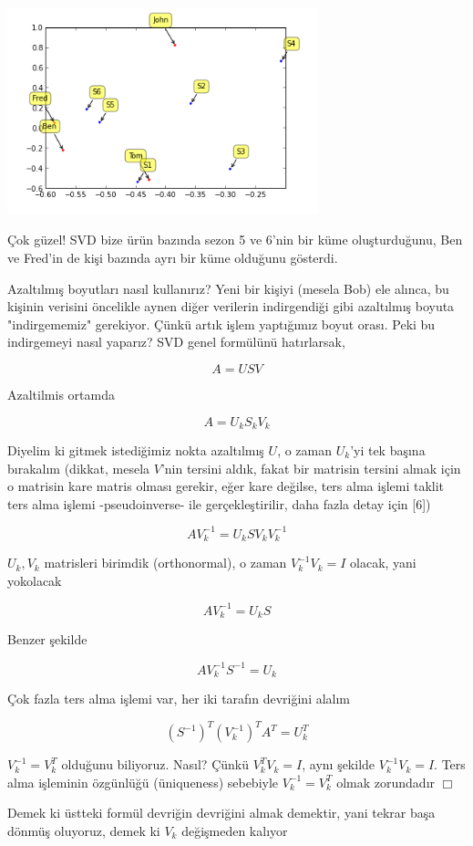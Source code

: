 \documentclass[12pt,fleqn]{article}\usepackage{../../common}
\begin{document}
\includegraphics[height=6cm]{svdrecom_1.png}

Çok güzel! SVD bize ürün bazında sezon 5 ve 6'nin bir küme
oluşturduğunu, Ben ve Fred'in de kişi bazında ayrı bir küme olduğunu
gösterdi.

Azaltılmış boyutları nasıl kullanırız? Yeni bir kişiyi (mesela Bob)
ele alınca, bu kişinin verisini öncelikle aynen diğer verilerin
indirgendiği gibi azaltılmış boyuta "indirgememiz" gerekiyor. Çünkü
artık işlem yaptığımız boyut orası. Peki bu indirgemeyi nasıl yaparız?
SVD genel formülünü hatırlarsak,

$$ A = USV $$

Azaltilmis ortamda

$$ A = U_k S_k V_k $$

Diyelim ki gitmek istediğimiz nokta azaltılmış $U$, o zaman $U_k$'yi tek
başına bırakalım (dikkat, mesela $V$'nin tersini aldık, fakat bir matrisin
tersini almak için o matrisin kare matris olması gerekir, eğer kare
değilse, ters alma işlemi taklit ters alma işlemi -pseudoinverse- ile
gerçekleştirilir, daha fazla detay için [6])

$$ A V_k^{-1} = U_k S V_k V_k^{-1} $$

$U_k,V_k$ matrisleri birimdik (orthonormal), o zaman $V_k^{-1}V_k = I$
olacak, yani yokolacak

$$ A V_k^{-1} = U_k S  $$

Benzer şekilde

$$  A V_k^{-1} S^{-1} = U_k $$

Çok fazla ters alma işlemi var, her iki tarafın devriğini alalım

$$ (S^{-1})^T (V_k^{-1})^T A^T = U_k^T $$

$V_k^{-1} = V_k^T$ olduğunu biliyoruz. Nasıl? Çünkü $ V_k^TV_k = I $, aynı
şekilde $ V_k^{-1}V_k = I $. Ters alma işleminin özgünlüğü (üniqueness)
sebebiyle $V_k^{-1} = V_k^T$ olmak zorundadır $\Box$

Demek ki üstteki formül devriğin devriğini almak demektir, yani tekrar başa
dönmüş oluyoruz, demek ki $V_k$ değişmeden kalıyor
\end{document}
